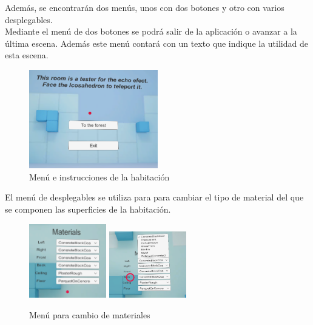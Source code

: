 \quad Además, se encontrarán dos menús, unos con dos botones y otro con varios desplegables.\\

\quad Mediante el menú de dos botones se podrá salir de la aplicación o avanzar a la última escena. Además este menú contará con un texto que indique la utilidad de esta escena.\\

\begin{figure}[htb]
	\centering
	\includegraphics[width=0.5\textwidth]{./imagenes/echoMenu}
	\caption{Menú e instrucciones de la habitación}
\end{figure}

\quad El menú de desplegables se utiliza para para cambiar el tipo de material del que se componen las superficies de la habitación.\\

\begin{figure}[htb]
	\centering
	\includegraphics[width=0.3\textwidth]{./imagenes/materialMenu}
	\includegraphics[width=0.3\textwidth]{./imagenes/materialMenuDeploy}
	\caption{Menú para cambio de materiales}
\end{figure}
\FloatBarrier

	
